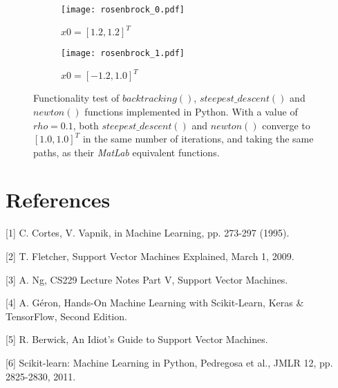 \documentclass[10pt, a4paper,reqno]{amsart}
\begin{document}
\begin{figure}[H]
	\centering	
	\begin{subfigure}{1.0\textwidth}
		\centering
		\texttt{[image: rosenbrock\_0.pdf]}
		\caption{$x0 = [1.2, 1.2]^T$}
	\end{subfigure}
	\begin{subfigure}{1.0\textwidth}
		\centering
		\texttt{[image: rosenbrock\_1.pdf]}
		\caption{$x0 = [-1.2, 1.0]^T$}
	\end{subfigure}
	\caption{Functionality test of $backtracking()$, $steepest\_descent()$ and $newton()$ functions implemented in Python. With a value of $rho = 0.1$, both $steepest\_descent()$ and $newton()$ converge to $[1.0, 1.0]^T$ in the same number of iterations, and taking the same paths, as their \emph{MatLab} equivalent functions.}
\end{figure}


%
%
\clearpage\section{References}

[1] C. Cortes, V. Vapnik, in Machine Learning, pp. 273-297 (1995).

[2] T. Fletcher, Support Vector Machines Explained, March 1, 2009.

[3] A. Ng, CS229 Lecture Notes Part V, Support Vector Machines.

[4] A. G\'{e}ron, Hands-On Machine Learning with Scikit-Learn, Keras \& TensorFlow, Second Edition.

[5] R. Berwick, An Idiot's Guide to Support Vector Machines.

[6] Scikit-learn: Machine Learning in Python, Pedregosa et al., JMLR 12, pp. 2825-2830, 2011.
\end{document}
